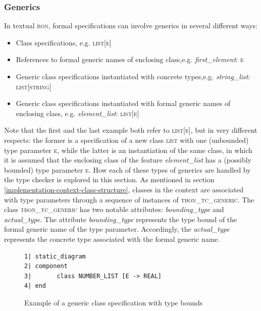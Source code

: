 \subsubsection{Generics}
\label{implementation-generics}
In textual \textsc{bon}, formal specifications can involve generics in several different ways:
\begin{itemize}
\item Class specifications, e.g. \textsc{list}[\textsc{e}]
\item References to formal generic names of enclosing class,\newline e.g. \textit{first\_element}: \textsc{e}
\item Generic class specifications instantiated with concrete types,\newline e.g. \textit{string\_list}: \textsc{list}[\textsc{string}]
\item Generic class specifications instantiated with formal generic names of enclosing class, e.g.  \textit{element\_list}: \textsc{list}[\textsc{e}]
\end{itemize}
Note that the first and the last example both refer to \textsc{list}[\textsc{e}], but in very different respects: the former is a specification of a new class \textsc{list} with one (unbounded) type parameter \textsc{e}, while the latter is an instantiation of the same class, in which it is assumed that the enclosing class of the feature \textit{element\_list} has a (possibly bounded) type parameter \textsc{e}. How each of these types of generics are handled by the type checker is explored in this section.
As mentioned in section \ref{implementation-context-class-structure}, classes in the context are associated with type parameters through a sequence of instances of \textsc{tbon}\_\textsc{tc}\_\textsc{generic}. The class \textsc{tbon}\_\textsc{tc}\_\textsc{generic} has two notable attributes: \textit{bounding\_type} and \textit{actual\_type}. The attribute \textit{bounding\_type} represents the type bound of the formal generic name of the type parameter. Accordingly, the \textit{actual\_type} represents the concrete type associated with the formal generic name.

\begin{figure}[H]
{\footnotesize
\begin{verbatim}
1| static_diagram
2| component
3|       class NUMBER_LIST [E -> REAL]
4| end
\end{verbatim}
}
\caption{Example of a generic class specification with type bounds}
\label{fig:generic_class_specification_bounded}
\end{figure}

